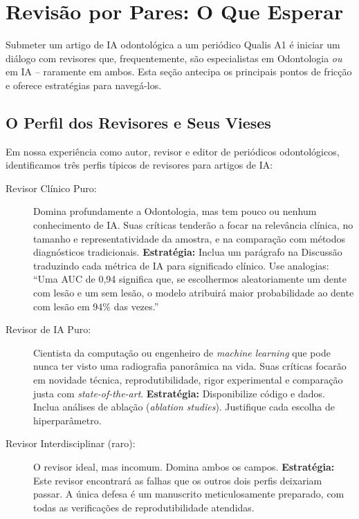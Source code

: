 
\section{Revisão por Pares: O Que Esperar}
\label{sec:revisao-pares}

\nivelquatro

Submeter um artigo de IA odontológica a um periódico Qualis A1 é iniciar um
diálogo com revisores que, frequentemente, são especialistas em Odontologia
\textit{ou} em IA -- raramente em ambos. Esta seção antecipa os principais
pontos de fricção e oferece estratégias para navegá-los.

\subsection{O Perfil dos Revisores e Seus Vieses}

Em nossa experiência como autor, revisor e editor de periódicos odontológicos,
identificamos três perfis típicos de revisores para artigos de IA:

\begin{description}
  \item[Revisor Clínico Puro:] Domina profundamente a Odontologia, mas tem
    pouco ou nenhum conhecimento de IA. Suas críticas tenderão a focar na
    relevância clínica, no tamanho e representatividade da amostra, e na
    comparação com métodos diagnósticos tradicionais. \textbf{Estratégia:}
    Inclua um parágrafo na Discussão traduzindo cada métrica de IA para
    significado clínico. Use analogias: ``Uma AUC de 0,94 significa que, se
    escolhermos aleatoriamente um dente com lesão e um sem lesão, o modelo
    atribuirá maior probabilidade ao dente com lesão em 94\% das vezes.''

  \item[Revisor de IA Puro:] Cientista da computação ou engenheiro de
    \textit{machine learning} que pode nunca ter visto uma radiografia
    panorâmica na vida. Suas críticas focarão em novidade técnica,
    reprodutibilidade, rigor experimental e comparação justa com
    \textit{state-of-the-art}. \textbf{Estratégia:} Disponibilize código e
    dados. Inclua análises de ablação (\textit{ablation studies}). Justifique
    cada escolha de hiperparâmetro.

  \item[Revisor Interdisciplinar (raro):] O revisor ideal, mas incomum.
    Domina ambos os campos. \textbf{Estratégia:} Este revisor encontrará as
    falhas que os outros dois perfis deixariam passar. A única defesa é um
    manuscrito meticulosamente preparado, com todas as verificações de
    reprodutibilidade atendidas.
\end{description}

